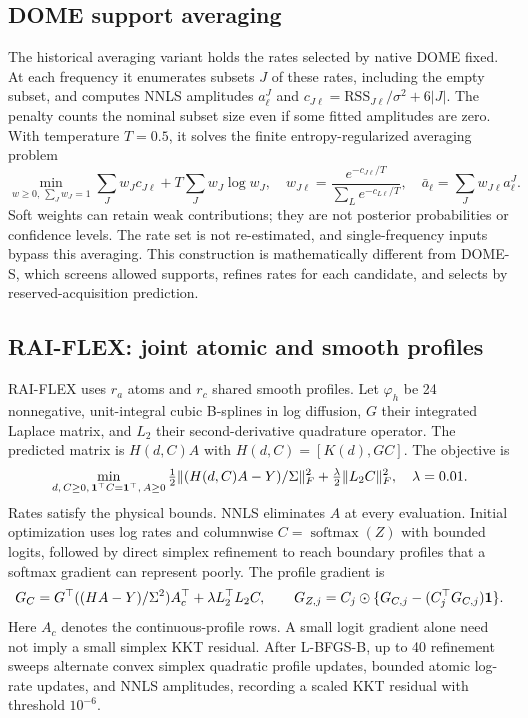 \subsection{DOME support averaging}\label{app:domeaverage}
The historical averaging variant holds the rates selected by native DOME fixed. At each frequency it enumerates subsets $J$ of these rates, including the empty subset, and computes NNLS amplitudes $a^{J}_\ell$ and $c_{J\ell}=\mathrm{RSS}_{J\ell}/\sigma^2+6|J|$. The penalty counts the nominal subset size even if some fitted amplitudes are zero. With temperature $T=0.5$, it solves the finite entropy-regularized averaging problem
\begin{equation}\label{eq:domeaverage}
 \min_{w\geq0,\,\sum_Jw_J=1}\sum_Jw_Jc_{J\ell}+T\sum_Jw_J\log w_J,
 \quad w_{J\ell}=\frac{e^{-c_{J\ell}/T}}{\sum_Le^{-c_{L\ell}/T}},\quad
 \bar a_\ell=\sum_Jw_{J\ell}a^J_\ell.
\end{equation}
Soft weights can retain weak contributions; they are not posterior probabilities or confidence levels. The rate set is not re-estimated, and single-frequency inputs bypass this averaging. This construction is mathematically different from DOME-S, which screens allowed supports, refines rates for each candidate, and selects by reserved-acquisition prediction.

\subsection{RAI-FLEX: joint atomic and smooth profiles}\label{app:raiflex}
RAI-FLEX uses $r_a$ atoms and $r_c$ shared smooth profiles. Let $\varphi_h$ be 24 nonnegative, unit-integral cubic B-splines in log diffusion, $G$ their integrated Laplace matrix, and $L_2$ their second-derivative quadrature operator. The predicted matrix is $H(d,C)A$ with $H(d,C)=[K(d),GC]$. The objective is
\begin{equation}\label{eq:raiflex}
 \min_{d,\,C\geq0,\,\mathbf{1}^\top C=\mathbf{1}^\top,\,A\geq0}
 \tfrac12\|(H(d,C)A-Y)/\Sigma\|_F^2+\tfrac\lambda2\|L_2C\|_F^2,
 \quad \lambda=0.01.
\end{equation}
Rates satisfy the physical bounds. NNLS eliminates $A$ at every evaluation. Initial optimization uses log rates and columnwise $C=\operatorname{softmax}(Z)$ with bounded logits, followed by direct simplex refinement to reach boundary profiles that a softmax gradient can represent poorly. The profile gradient is
\begin{equation}\label{eq:flexgrad}
 G_C=G^\top((HA-Y)/\Sigma^2)A_c^\top+\lambda L_2^\top L_2C,
 \qquad G_{Z,j}=C_j\odot\{G_{C,j}-(C_j^\top G_{C,j})\mathbf{1}\}.
\end{equation}
Here $A_c$ denotes the continuous-profile rows. A small logit gradient alone need not imply a small simplex KKT residual. After L-BFGS-B, up to 40 refinement sweeps alternate convex simplex quadratic profile updates, bounded atomic log-rate updates, and NNLS amplitudes, recording a scaled KKT residual with threshold $10^{-6}$.

